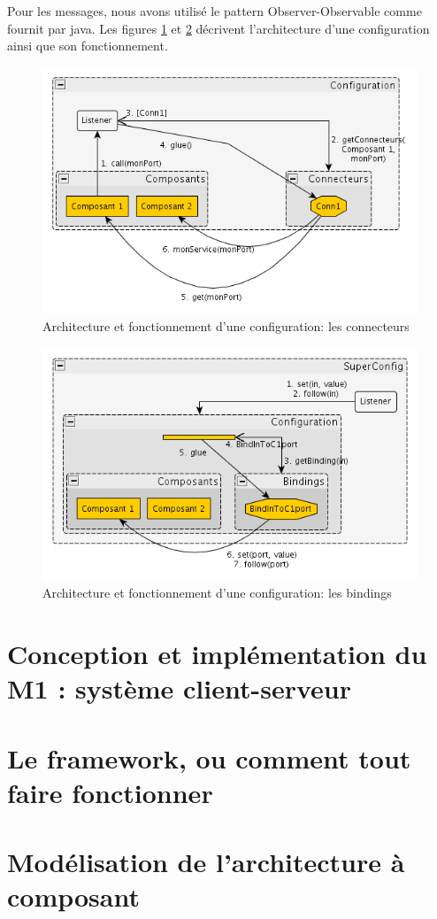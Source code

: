 \documentclass[a4paper, titlepage]{article}
\begin{document}
			Pour les messages, nous avons utilisé le pattern Observer-Observable
			comme fournit par java. Les figures \ref{fig:obsimpl} et
			\ref{fig:obsimpl2} décrivent l'architecture
			d'une configuration ainsi que son fonctionnement.
			
			\begin{figure}[ht]
				\centering
				\includegraphics[width=1.00\textwidth]{obsimpl.png}
				\caption{Architecture et fonctionnement d'une configuration: les connecteurs}
				\label{fig:obsimpl}
			\end{figure}
			
			\begin{figure}[ht]
				\centering
				\includegraphics[width=1.00\textwidth]{obsimpl2.png}
				\caption{Architecture et fonctionnement d'une configuration: les bindings}
				\label{fig:obsimpl2}
			\end{figure}
			
			
	\section{Conception et implémentation du M1 : système client-serveur}
	
	
	\section{Le framework, ou comment tout faire fonctionner}
	
	
	\section{Modélisation de l'architecture à composant}
	
	
	
	
\end{document}
